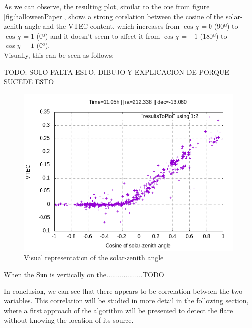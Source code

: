 As we can observe, the resulting plot, similar to the one from figure \ref{fig:halloweenPaper}, shows a strong corelation between the cosine of the solar-zenith angle and the VTEC content, which increases from $\cos\chi = 0$ (90º) to $\cos\chi = 1$ (0º) and it doesn't seem to affect it from $\cos\chi = -1$ (180º) to $\cos\chi = 1$ (0º). \\

Visually, this can be seen as follows:

TODO: SOLO FALTA ESTO, DIBUJO Y EXPLICACION DE PORQUE SUCEDE ESTO

\begin{figure}[!htb]
	\begin{centering}
		\includegraphics[width=0.5\linewidth]{images/ch4/resultSunTest.png}
		\caption{Visual representation of the solar-zenith angle}
		\label{fig:solar-zenith-angle}
	\end{centering}
\end{figure}

When the Sun is vertically on the...................TODO





In conclusion, we can see that there appears to be correlation between the two variables. This correlation will be studied in more detail in the following section, where a first approach of the algorithm will be presented to detect the flare without knowing the location of its source.













